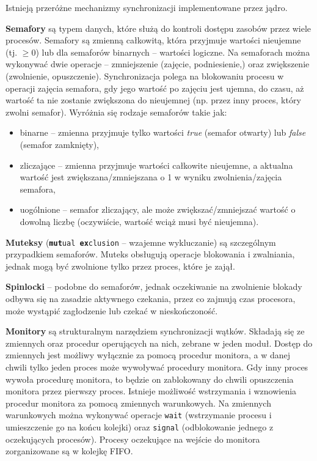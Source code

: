 Istnieją przeróżne mechanizmy synchronizacji implementowane przez jądro.

\textbf{Semafory} są typem danych, które służą do kontroli dostępu zasobów przez wiele procesów.
Semafory są zmienną całkowitą, która przyjmuje wartości nieujemne (tj. $\ge 0$) lub dla semaforów binarnych -- wartości logiczne.
Na semaforach można wykonywać dwie operacje -- zmniejszenie (zajęcie, podniesienie,) oraz zwiększenie (zwolnienie, opuszczenie).
Synchronizacja polega na blokowaniu procesu w operacji zajęcia semafora, gdy jego wartość po zajęciu jest ujemna, do czasu, aż wartość ta nie zostanie zwiększona do nieujemnej (np. przez inny proces, który zwolni semafor).
Wyróżnia się rodzaje semaforów takie jak:
\begin{itemize}
	\setlength\itemsep{1pt}
	\item binarne -- zmienna przyjmuje tylko wartości \textit{true} (semafor otwarty) lub \textit{false} (semafor zamknięty),
	\item zliczające -- zmienna przyjmuje wartości całkowite nieujemne, a aktualna wartość jest zwiększana/zmniejszana o 1 w wyniku zwolnienia/zajęcia semafora,
	\item uogólnione -- semafor zliczający, ale może zwiększać/zmniejszać wartość o dowolną liczbę (oczywiście, wartość wciąż musi być nieujemna).
\end{itemize}

\textbf{Muteksy} (\texttt{\textbf{mut}ual \textbf{ex}clusion} -- wzajemne wykluczanie) są szczególnym przypadkiem semaforów. Muteks obsługują operacje blokowania i zwalniania, jednak mogą być zwolnione tylko przez proces, które je zajął.

\textbf{Spinlocki} -- podobne do semaforów, jednak oczekiwanie na zwolnienie blokady odbywa się na zasadzie aktywnego czekania, przez co zajmują czas procesora, może wystąpić zagłodzenie lub czekać w nieskończoność.

\textbf{Monitory} są strukturalnym narzędziem synchronizacji wątków. Składają się ze zmiennych oraz procedur operujących na nich, zebrane w jeden moduł. Dostęp do zmiennych jest możliwy wyłącznie za pomocą procedur monitora, a w danej chwili tylko jeden proces może wywoływać procedury monitora. Gdy inny proces wywoła procedurę monitora, to będzie on zablokowany do chwili opuszczenia monitora przez pierwszy proces. Istnieje możliwość wstrzymania i wznowienia procedur monitora za pomocą zmiennych warunkowych. Na zmiennych warunkowych można wykonywać operacje \texttt{wait} (wstrzymanie procesu i umieszczenie go na końcu kolejki) oraz \texttt{signal} (odblokowanie jednego z oczekujących procesów). Procesy oczekujące na wejście do monitora zorganizowane są w kolejkę FIFO.